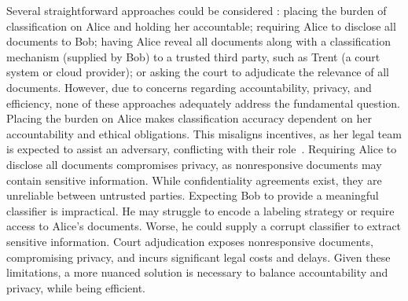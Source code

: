 Several straightforward approaches could be considered \citep*{dong2022classification}: placing the burden of classification on Alice and holding her accountable; requiring Alice to disclose all documents to Bob; having Alice reveal all documents along with a classification mechanism (supplied by Bob) to a trusted third party, such as Trent (a court system or cloud provider); or asking the court to adjudicate the relevance of all documents.  
However, due to concerns regarding accountability, privacy, and efficiency, none of these approaches adequately address the fundamental question.  
Placing the burden on Alice makes classification accuracy dependent on her accountability and ethical obligations. This misaligns incentives, as her legal team is expected to assist an adversary, conflicting with their role~\citep{gelbach2015law}. Requiring Alice to disclose all documents compromises privacy, as nonresponsive documents may contain sensitive information. While confidentiality agreements exist, they are unreliable between untrusted parties. Expecting Bob to provide a meaningful classifier is impractical. He may struggle to encode a labeling strategy or require access to Alice’s documents. Worse, he could supply a corrupt classifier to extract sensitive information. Court adjudication exposes nonresponsive documents, compromising privacy, and incurs significant legal costs and delays.
Given these limitations, a more nuanced solution is necessary to balance accountability and privacy, while being efficient.


